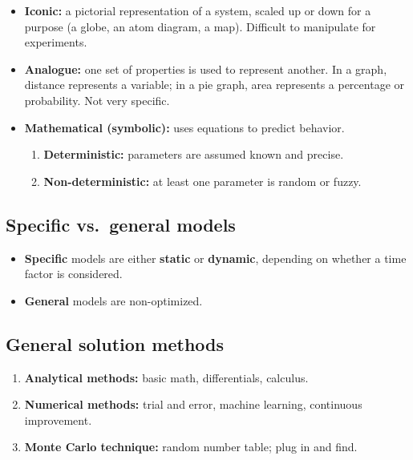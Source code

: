 \documentclass[11pt]{article}
\begin{document}
\begin{itemize}
    \item \textbf{Iconic:} a pictorial representation of a system, scaled up or
          down for a purpose (a globe, an atom diagram, a map). Difficult to
          manipulate for experiments.
    \item \textbf{Analogue:} one set of properties is used to represent another.
          In a graph, distance represents a variable; in a pie graph, area
          represents a percentage or probability. Not very specific.
    \item \textbf{Mathematical (symbolic):} uses equations to predict behavior.
    \begin{enumerate}
        \item[(i)] \textbf{Deterministic:} parameters are assumed known and precise.
        \item[(ii)] \textbf{Non-deterministic:} at least one parameter is random or fuzzy.
    \end{enumerate}
\end{itemize}

\subsection*{Specific vs.\ general models}

\begin{itemize}
    \item \textbf{Specific} models are either \textbf{static} or \textbf{dynamic},
          depending on whether a time factor is considered.
    \item \textbf{General} models are non-optimized.
\end{itemize}

\subsection*{General solution methods}

\begin{enumerate}
    \item[(i)] \textbf{Analytical methods:} basic math, differentials, calculus.
    \item[(ii)] \textbf{Numerical methods:} trial and error, machine learning,
          continuous improvement.
    \item[(iii)] \textbf{Monte Carlo technique:} random number table; plug in and find.
\end{enumerate}
\end{document}
